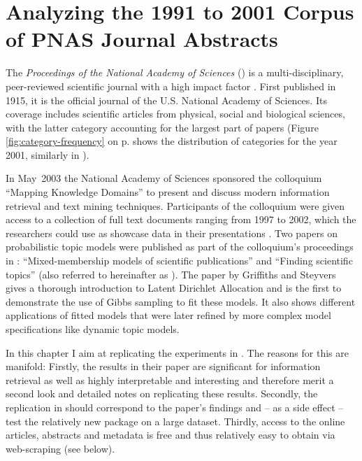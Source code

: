 \chapter{Analyzing the 1991 to 2001 Corpus of PNAS Journal Abstracts}
\label{ch:analysing-pnas}

The \emph{Proceedings of the National Academy of Sciences} () is a multi-disciplinary, peer-reviewed scientific journal with a high impact factor \citep{PNAS2010a}. First published in 1915, it is the official journal of the U.S. National Academy of Sciences. Its coverage includes scientific articles from physical, social and biological sciences, with the latter category accounting for the largest part of papers (Figure \ref{fig:category-frequency} on p. \pageref{fig:category-frequency} shows the distribution of categories for the year 2001, similarly in \citealt{Erosheva2004}).


In May~2003 the National Academy of Sciences sponsored the colloquium ``Mapping Knowledge Domains'' to present and discuss modern information retrieval and text mining techniques. Participants of the colloquium were given access to a collection of  full text documents ranging from 1997 to 2002, which the researchers could use as showcase data in their presentations \citep{Shiffrin2004}. Two papers on probabilistic topic models were published as part of the colloquium's proceedings in : ``Mixed-membership models of scientific publications'' \citep{Erosheva2004} and ``Finding scientific topics'' \citep{Griffiths2004} (also referred to hereinafter as ). The paper by Griffiths and Steyvers gives a thorough introduction to Latent Dirichlet Allocation and is the first to demonstrate the use of Gibbs sampling to fit these models. It also shows different applications of fitted models that were later refined by more complex model specifications like dynamic topic models.



In this chapter I aim at replicating the experiments in . The reasons for this are manifold: Firstly, the results in their paper are significant for information retrieval as well as highly interpretable and interesting and therefore merit a second look and detailed notes on replicating these results. Secondly, the replication in  should correspond to the paper's findings and -- as a side effect -- test the relatively new package  on a large dataset. Thirdly, access to the online  articles, abstracts and metadata is free and thus relatively easy to obtain via web-scraping (see below).

